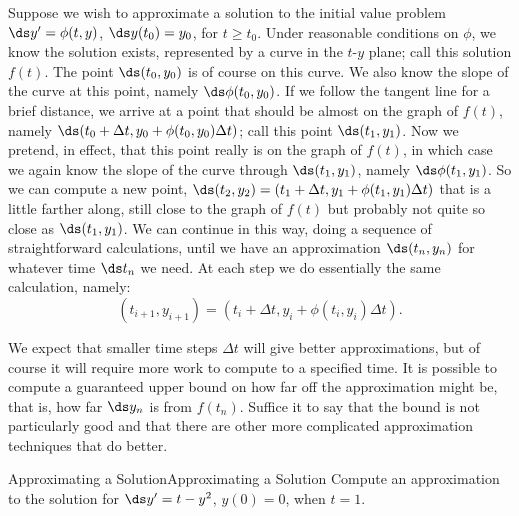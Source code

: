 Suppose we wish to approximate a solution to the initial value problem
$\ds y'=\phi(t,y)$, $\ds y(t_0)=y_0$, for $t\ge t_0$. Under
reasonable conditions on $\phi$, we know the solution exists,
represented by a curve in the $t$-$y$ plane; call this solution
$f(t)$. The point $\ds (t_0,y_0)$ is of course on this curve. We also
know the slope of the curve at this point, namely
$\ds\phi(t_0,y_0)$. If we follow the tangent line for a brief
distance, we arrive at a point that should be almost on the graph of
$f(t)$, namely $\ds(t_0+\Delta t, y_0+\phi(t_0,y_0)\Delta t)$; call
this point $\ds(t_1,y_1)$. Now we pretend, in effect, that this point
really is on the graph of $f(t)$, in which case we again know the
slope of the curve through $\ds(t_1,y_1)$, namely
$\ds\phi(t_1,y_1)$. So we can compute a new point,
$\ds(t_2,y_2)=(t_1+\Delta t, y_1+\phi(t_1,y_1)\Delta t)$ that 
is a little farther along, still close to the graph of $f(t)$ but
probably not quite so close as $\ds(t_1,y_1)$. We can continue in this
way, doing a sequence of straightforward calculations, until we have
an approximation $\ds(t_n,y_n)$ for whatever time $\ds t_n$ we need. 
At each step we do essentially the same calculation, namely:
$$(t_{i+1},y_{i+1})=(t_i+\Delta t, y_i+\phi(t_i,y_i)\Delta t).$$

We expect that smaller time steps $\Delta t$ will give better
approximations, but of course it will require more work to compute to
a specified time. It is possible to compute a guaranteed upper bound
on how far off the approximation might be, that is, how far $\ds y_n$
is from $f(t_n)$. Suffice it to say that the bound is not particularly
good and that there are other more complicated approximation
techniques that do better.

\begin{example}{Approximating a Solution}{Approximating a Solution}\label{Approximating a Solution}
Compute an approximation to the solution for $\ds y'=t-y^2$, $y(0)=0$, when $t=1$.
\end{example}

